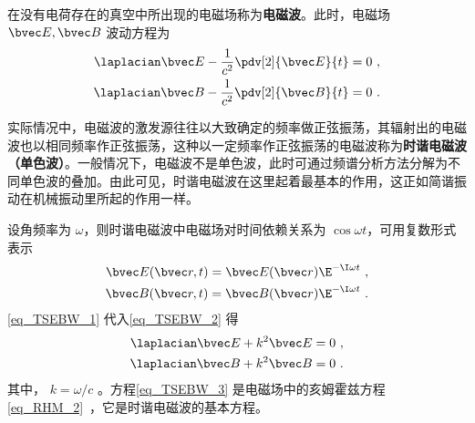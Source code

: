 
在没有电荷存在的真空中所出现的电磁场称为\textbf{电磁波}。此时，电磁场 $\bvec E,\bvec B$ 波动方程为
\begin{equation}\label{eq_TSEBW_2}
\begin{aligned}
\laplacian\bvec E-\frac{1}{c^2}\pdv[2]{\bvec E}{t}=0~,\\
\laplacian\bvec B-\frac{1}{c^2}\pdv[2]{\bvec B}{t}=0~.
\end{aligned}
\end{equation}

实际情况中，电磁波的激发源往往以大致确定的频率做正弦振荡，其辐射出的电磁波也以相同频率作正弦振荡，这种以一定频率作正弦振荡的电磁波称为\textbf{时谐电磁波（单色波）}。一般情况下，电磁波不是单色波，此时可通过频谱分析方法分解为不同单色波的叠加。由此可见，时谐电磁波在这里起着最基本的作用，这正如简谐振动在机械振动里所起的作用一样。

设角频率为 $\omega$，则时谐电磁波中电磁场对时间依赖关系为 $\cos\omega t$，可用复数形式表示
\begin{equation}\label{eq_TSEBW_1}
\begin{aligned}
\bvec E(\bvec r,t)=\bvec E(\bvec r)\E^{-\I\omega t}~,\\
\bvec B(\bvec r,t)=\bvec B(\bvec r)\E^{-\I\omega t}~.
\end{aligned}
\end{equation}
\autoref{eq_TSEBW_1} 代入\autoref{eq_TSEBW_2} 得
\begin{equation}\label{eq_TSEBW_3}
\begin{aligned}
\laplacian\bvec E+k^2\bvec E=0~,\\
\laplacian\bvec B+k^2\bvec B=0~.
\end{aligned}
\end{equation}
其中， $k=\omega/c$ 。方程\autoref{eq_TSEBW_3} 是电磁场中的亥姆霍兹方程\autoref{eq_RHM_2}~，它是时谐电磁波的基本方程。